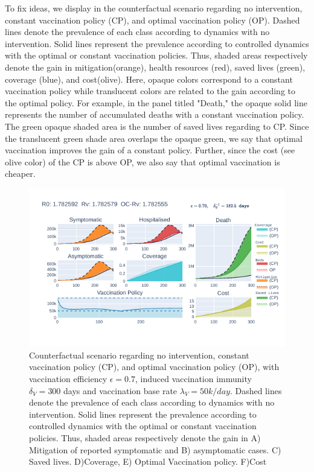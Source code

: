     To fix ideas,  we display in  the counterfactual
scenario regarding no intervention, constant vaccination policy (CP), and
optimal vaccination policy (OP). Dashed lines denote the prevalence of each
class according to dynamics with no intervention. Solid lines represent the
prevalence according to controlled dynamics with the optimal or constant
vaccination policies. Thus, shaded areas respectively denote the gain in
mitigation(orange), health resources (red), saved lives (green), coverage
(blue), and cost(olive). Here, opaque colors correspond to a constant
vaccination policy while translucent colors are related to the gain
according to the optimal policy. For example, in the panel titled "Death,"
the opaque solid line represents the number of accumulated deaths with a
constant vaccination policy. The green opaque shaded area is the number of
saved lives regarding to CP. Since the translucent green shade area overlaps
the opaque green, we say that optimal vaccination improves the gain of a
constant policy. Further, since the cost (see olive color) of the CP is above
OP, we also say that optimal vaccination is cheaper.
\begin{figure}[h!]
  \includegraphics[width=\textwidth]{fig1.pdf}
  \caption{
        Counterfactual scenario regarding no intervention, constant
        vaccination policy (CP), and optimal vaccination policy (OP),
        with vaccination efficiency $\epsilon = 0.7$, induced vaccination
        immunity $\delta_V= 300$ days and vaccination base rate
        $\lambda_V = 50 k/day$.
        Dashed lines denote the prevalence of each class according to
        dynamics with no intervention. Solid lines represent
        the prevalence according to controlled dynamics with the
        optimal or constant vaccination policies. Thus, shaded areas
        respectively denote the gain in
        A) Mitigation of reported symptomatic and B) asymptomatic cases.
        C) Saved lives. D)Coverage, E) Optimal Vaccination policy.
        F)Cost
}
        \label{fig:bocop_scene}
\end{figure}


